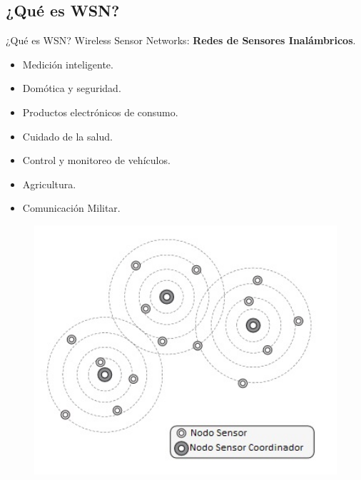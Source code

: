\documentclass[aspectratio=169, handout]{beamer}
\begin{document}
\subsection[WSN]{¿Qué es WSN?}
\begin{frame}{¿Qué es WSN?} 
\noindent Wireless Sensor Networks: \textbf{Redes de Sensores Inalámbricos}.
\begin{minipage}[c]{1.0\linewidth}
	\begin{minipage}[c]{0.5\linewidth}

		\begin{itemize}
			\item Medición inteligente.
			\item Domótica y seguridad.
			\item Productos electrónicos de consumo.
			\item Cuidado de la salud.
			\item Control y monitoreo de vehículos.
			\item Agricultura.
			\item Comunicación Militar.
		\end{itemize}

\end{minipage}
	\begin{minipage}[c]{0.45\linewidth}
		\begin{figure}[H]			
		\includegraphics[width=1.2\textwidth]{./imagenes/WSN.jpg}
		\end{figure}	  	  	
	\end{minipage}
\end{minipage}
\end{frame}
\end{document}
